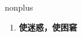 
\begin{frame}
{\huge nonplus}
\begin{center}
\begin{enumerate}\Large
  \item \textbf{使迷惑，使困窘}
\end{enumerate}
\end{center}
\end{frame}
